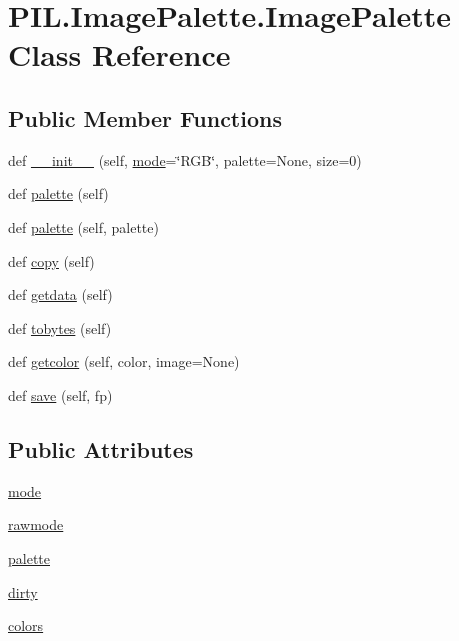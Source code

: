 \hypertarget{classPIL_1_1ImagePalette_1_1ImagePalette}{}\section{P\+I\+L.\+Image\+Palette.\+Image\+Palette Class Reference}
\label{classPIL_1_1ImagePalette_1_1ImagePalette}
\subsection*{Public Member Functions}
\begin{DoxyCompactItemize}
\item 
def \hyperlink{classPIL_1_1ImagePalette_1_1ImagePalette_a52d292bfd5557fd362429e1716a49cd7}{\+\_\+\+\_\+init\+\_\+\+\_\+} (self, \hyperlink{classPIL_1_1ImagePalette_1_1ImagePalette_a313cc7fc974827ec1ec75b756b81d6eb}{mode}=\char`\"{}R\+GB\char`\"{}, palette=None, size=0)
\item 
def \hyperlink{classPIL_1_1ImagePalette_1_1ImagePalette_a7884b919befb2fd9aacaa4bfeeb47e1c}{palette} (self)
\item 
def \hyperlink{classPIL_1_1ImagePalette_1_1ImagePalette_aed828437d59530fe7bb008fb3b57eedb}{palette} (self, palette)
\item 
def \hyperlink{classPIL_1_1ImagePalette_1_1ImagePalette_a2987eb0a8b683392a77ab864da9bbefc}{copy} (self)
\item 
def \hyperlink{classPIL_1_1ImagePalette_1_1ImagePalette_a1a35e0e1f28ad44fdd6377d229a4f150}{getdata} (self)
\item 
def \hyperlink{classPIL_1_1ImagePalette_1_1ImagePalette_af3e87a3315388d7f927ecf38c28fd949}{tobytes} (self)
\item 
def \hyperlink{classPIL_1_1ImagePalette_1_1ImagePalette_a6dfcc2050f480e458f592046fcdf609d}{getcolor} (self, color, image=None)
\item 
def \hyperlink{classPIL_1_1ImagePalette_1_1ImagePalette_ac40b18c6f0f8f5ee8a96a861c00d33d5}{save} (self, fp)
\end{DoxyCompactItemize}
\subsection*{Public Attributes}
\begin{DoxyCompactItemize}
\item 
\hyperlink{classPIL_1_1ImagePalette_1_1ImagePalette_a313cc7fc974827ec1ec75b756b81d6eb}{mode}
\item 
\hyperlink{classPIL_1_1ImagePalette_1_1ImagePalette_ab214a175bb9ad50552979778a9fc3989}{rawmode}
\item 
\hyperlink{classPIL_1_1ImagePalette_1_1ImagePalette_a27734476bcd68516353aab90491e30d5}{palette}
\item 
\hyperlink{classPIL_1_1ImagePalette_1_1ImagePalette_a6e6c3c79440b7c27630cb3bbfa57698c}{dirty}
\item 
\hyperlink{classPIL_1_1ImagePalette_1_1ImagePalette_a194edbac72e4ec76d28a44cdd079f209}{colors}
\end{DoxyCompactItemize}
